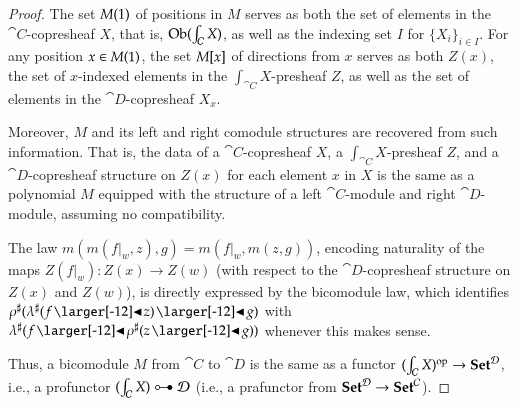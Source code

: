 \documentclass{amsart}
\begin{document}
\begin{proof}
  The set $M(1)$ of positions in $M$ serves as both the set of
  elements in the $\cat{C}$-copresheaf $X$, that is,
  $\operatorname{Ob}(\int_{\mathcal{C}}X)$, as well as the indexing set $I$ for
  $\{X_i\}_{i \in I}$. For any position $x \in M(1)$, the set
  $M[x]$ of directions from $x$ serves as both $Z(x)$, the set of
  $x$-indexed elements in the $\int_{\cat{C}}X$-presheaf $Z$, as well
  as the set of elements in the $\cat{D}$-copresheaf $X_x$.

  Moreover, $M$ and its left and right comodule structures are recovered
  from such information. That is, the data of a $\cat{C}$-copresheaf
  $X$, a $\int_{\cat{C}}X$-presheaf $Z$, and a $\cat{D}$-copresheaf
  structure on $Z(x)$ for each element $x$ in $X$ is the same as a
  polynomial $M$ equipped with the structure of a left
  $\cat{C}$-module and right $\cat{D}$-module, assuming no
  compatibility.

  The law $m(m(f|_w, z), g) = m(f|_w, m(z, g))$, encoding naturality
  of the maps $Z(f|_w): Z(x) \to Z(w)$ (with respect to the
  $\cat{D}$-copresheaf structure on $Z(x)$ and $Z(w)$), is directly
  expressed by the bicomodule law, which identifies
  $\anydirmapof{\rho}{\anydirmapof{\lambda}{f \subd z} \subd g}$ with
  $\anydirmapof{\lambda}{f \subd \anydirmapof{\rho}{z \subd g}}$ whenever
  this makes sense.

  Thus, a bicomodule $M$ from $\cat{C}$ to $\cat{D}$ is the same as a
  functor $(\int_{\mathcal{C}} X)^{\mathrm{op}} \to {\normalfont\mathbf{Set}}^{\mathcal{D}}$, i.e., a profunctor
  $(\int_{\cat{C}} X) \prof \cat{D}$ (i.e., a prafunctor from
  ${\normalfont\mathbf{Set}}^{\mathcal{D}} \to {\normalfont\mathbf{Set}}^{\mathcal{C}}$).
\end{proof}
\end{document}
